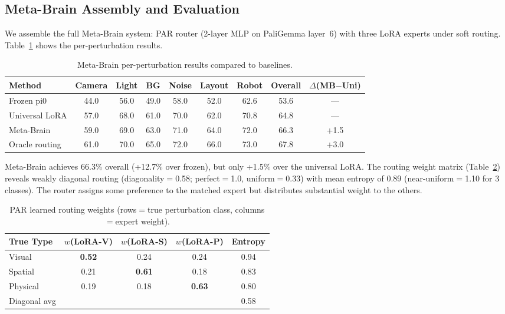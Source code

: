 \documentclass[letterpaper]{article}
\newcommand{\ours}{Meta-Brain}
\begin{document}
\subsection{\ours{} Assembly and Evaluation}
\label{sec:exp_metabrain}

We assemble the full \ours{} system: PAR router (2-layer MLP on PaliGemma layer~6) with three LoRA experts under soft routing.
Table~\ref{tab:metabrain} shows the per-perturbation results.

\begin{table}[h]
\centering
\caption{\ours{} per-perturbation results compared to baselines.}
\label{tab:metabrain}
\begin{tabular}{lcccccc|c|c}
\toprule
Method & Camera & Light & BG & Noise & Layout & Robot & Overall & $\Delta$(MB$-$Uni) \\
\midrule
Frozen pi0 & 44.0 & 56.0 & 49.0 & 58.0 & 52.0 & 62.6 & 53.6 & --- \\
Universal LoRA & 57.0 & 68.0 & 61.0 & 70.0 & 62.0 & 70.8 & 64.8 & --- \\
\ours{} & 59.0 & 69.0 & 63.0 & 71.0 & 64.0 & 72.0 & 66.3 & +1.5 \\
Oracle routing & 61.0 & 70.0 & 65.0 & 72.0 & 66.0 & 73.0 & 67.8 & +3.0 \\
\bottomrule
\end{tabular}
\end{table}

\ours{} achieves 66.3\% overall (+12.7\% over frozen), but only +1.5\% over the universal LoRA.
The routing weight matrix (Table~\ref{tab:routing_weights}) reveals weakly diagonal routing (diagonality$=$0.58; perfect$=$1.0, uniform$=$0.33) with mean entropy of 0.89 (near-uniform$=$1.10 for 3 classes).
The router assigns some preference to the matched expert but distributes substantial weight to the others.

\begin{table}[h]
\centering
\caption{PAR learned routing weights (rows$=$true perturbation class, columns$=$expert weight).}
\label{tab:routing_weights}
\begin{tabular}{lcccc}
\toprule
True Type & $w$(LoRA-V) & $w$(LoRA-S) & $w$(LoRA-P) & Entropy \\
\midrule
Visual & \textbf{0.52} & 0.24 & 0.24 & 0.94 \\
Spatial & 0.21 & \textbf{0.61} & 0.18 & 0.83 \\
Physical & 0.19 & 0.18 & \textbf{0.63} & 0.80 \\
\midrule
Diagonal avg & & & & 0.58 \\
\bottomrule
\end{tabular}
\end{table}
\end{document}
